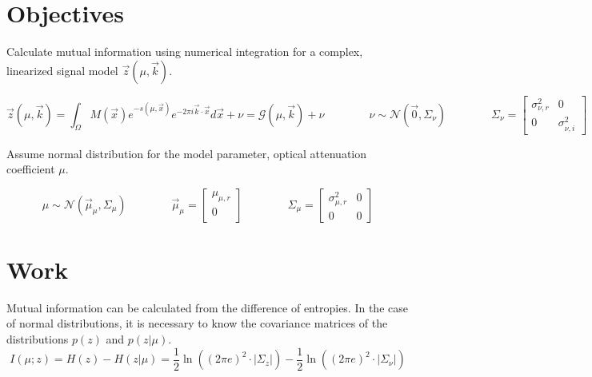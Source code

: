 \documentclass{article}         %
\theoremstyle{definition}
\theoremstyle{remark}
\begin{document}

\section{Objectives}\label{Objectives}

Calculate mutual information using numerical integration for a complex, linearized signal model $\vec{z}\left(\mu,\vec{k}\right)$.

\begin{equation}
	\vec{z}\left(\mu,\vec{k}\right) = \int_\Omega M\left(\vec{x}\right) e^{-s\left(\mu ,\vec{x}\right)}e^{-2\pi i\vec{k}\cdot\vec{x}}d\vec{x}+\nu=\mathcal{G}\left(\mu,\vec{k}\right)+\nu
	\qquad\qquad \nu\sim\mathcal{N}\left(\vec{0},\Sigma_\nu\right)
	\qquad\qquad \Sigma_\nu = \left[ \begin{array}{cc} 
		\sigma_{\nu,r}^2 & 0 \\
		0 & \sigma_{\nu,i}^2 \end{array} \right]
\end{equation}

Assume normal distribution for the model parameter, optical attenuation coefficient $\mu$.

\begin{equation}
	\mu\sim\mathcal{N}\left(\vec{\mu}_\mu,\Sigma_\mu\right)
	\qquad\qquad \vec{\mu}_\mu=\left[ \begin{array}{c}
		\mu_{\mu,r} \\ 0 \\ \end{array} \right]
	\qquad\qquad \Sigma_\mu=\left[\begin{array}{cc}
		\sigma_{\mu,r}^2 & 0 \\
		0 & 0 \end{array} \right]
\end{equation}

\section{Work}\label{Work}

Mutual information can be calculated from the difference of entropies. In the case of normal distributions, it is necessary to know the covariance matrices of the distributions $p\left(z\right)$ and $p\left(z|\mu\right)$.
\begin{equation}
	I\left(\mu;z\right) = H\left(z\right) - H\left(z|\mu\right) 
	= \frac{1}{2}\ln\left(\left(2\pi e\right)^2\cdot\lvert\Sigma_z\rvert\right) - \frac{1}{2}\ln\left(\left(2\pi e\right)^2\cdot\lvert\Sigma_\nu\rvert\right)
\end{equation}
\end{document}
